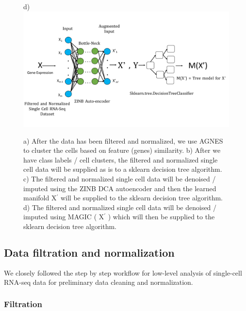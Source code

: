 \begin{figure}
\begin{framed}
\begin{minipage}{\linewidth}
\begin{minipage}[t]{0.48\linewidth}
\end{minipage}
\begin{minipage}[t]{0.48\linewidth}
\vspace{0pt}
\textsf{d)}\\
\includegraphics[width=\linewidth]{with_autoencoding.pdf}
\end{minipage}
\end{minipage}
\caption{a) After the data has been filtered and normalized, we use AGNES to cluster the cells based on feature (genes) similarity. b) After we have class labels / cell clusters, the filtered and normalized single cell data will be supplied as is to a sklearn decision tree algorithm. c) The filtered and normalized single cell data will be denoised / imputed using the ZINB DCA autoencoder and then the learned manifold X$^{'}$ will be supplied to the sklearn decision tree algorithm. d) The filtered and normalized single cell data will be denoised / imputed using MAGIC ( X$^{'}$ ) which will then be supplied to the sklearn decision tree algorithm.}
\end{framed}
\label{fig1}
\end{figure}

\subsection*{Data filtration and normalization}

We closely followed the step by step workflow for low-level analysis of single-cell RNA-seq data \citep{lun2016step} for preliminary data cleaning and normalization. 

\subsubsection*{Filtration} 

